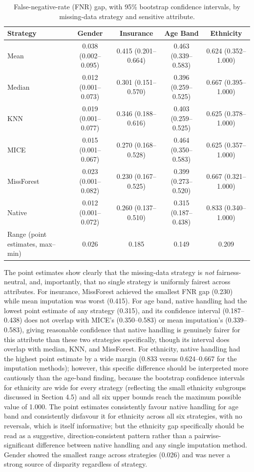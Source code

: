 \documentclass[12pt,a4paper]{report}
\begin{document}
\begin{table}[H]
\centering
\caption{False-negative-rate (FNR) gap, with 95\% bootstrap confidence intervals, by missing-data strategy and sensitive attribute.}
\label{tab:fairness-fnr-allmethods}
\small
\begin{tabular}{lcccc}
\toprule
Strategy & Gender & Insurance & Age Band & Ethnicity \\
\midrule
Mean & 0.038 (0.002--0.095) & 0.415 (0.201--0.664) & 0.463 (0.339--0.583) & 0.624 (0.352--1.000) \\
Median & 0.012 (0.001--0.073) & 0.301 (0.151--0.570) & 0.396 (0.259--0.525) & 0.667 (0.395--1.000) \\
KNN & 0.019 (0.001--0.077) & 0.346 (0.188--0.616) & 0.403 (0.259--0.525) & 0.625 (0.378--1.000) \\
MICE & 0.015 (0.001--0.067) & 0.270 (0.168--0.528) & 0.464 (0.350--0.583) & 0.625 (0.357--1.000) \\
MissForest & 0.023 (0.001--0.082) & 0.230 (0.167--0.525) & 0.399 (0.273--0.520) & 0.667 (0.321--1.000) \\
Native & 0.012 (0.001--0.072) & 0.260 (0.137--0.510) & 0.315 (0.187--0.438) & 0.833 (0.340--1.000) \\
\midrule
Range (point estimates, max--min) & 0.026 & 0.185 & 0.149 & 0.209 \\
\bottomrule
\end{tabular}
\end{table}


The point estimates show clearly that the missing-data strategy is \emph{not} fairness-neutral, and, importantly, that no single strategy is uniformly fairest across attributes. For insurance, MissForest achieved the smallest FNR gap (0.230) while mean imputation was worst (0.415). For age band, native handling had the lowest point estimate of any strategy (0.315), and its confidence interval (0.187--0.438) does not overlap with MICE's (0.350--0.583) or mean imputation's (0.339--0.583), giving reasonable confidence that native handling is genuinely fairer for this attribute than these two strategies specifically, though its interval does overlap with median, KNN, and MissForest. For ethnicity, native handling had the highest point estimate by a wide margin (0.833 versus 0.624--0.667 for the imputation methods); however, this specific difference should be interpreted more cautiously than the age-band finding, because the bootstrap confidence intervals for ethnicity are wide for every strategy (reflecting the small ethnicity subgroups discussed in Section 4.5) and all six upper bounds reach the maximum possible value of 1.000. The point estimates consistently favour native handling for age band and consistently disfavour it for ethnicity across all six strategies, with no reversals, which is itself informative; but the ethnicity gap specifically should be read as a suggestive, direction-consistent pattern rather than a pairwise-significant difference between native handling and any single imputation method. Gender showed the smallest range across strategies (0.026) and was never a strong source of disparity regardless of strategy.
\end{document}
